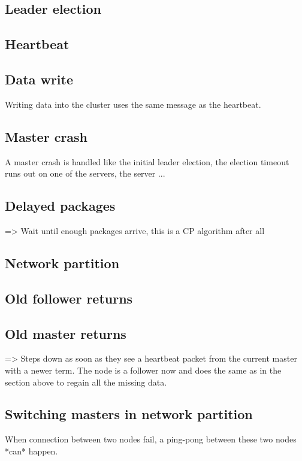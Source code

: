 \subsection{Leader election}

\subsection{Heartbeat}

\subsection{Data write}
Writing data into the cluster uses the same message as the heartbeat.


\subsection{Master crash}
A master crash is handled like the initial leader election, the election timeout runs out on one of the servers, the server ...

\subsection{Delayed packages}
=> Wait until enough packages arrive, this is a CP algorithm after all

\subsection{Network partition}

\subsection{Old follower returns}


\subsection{Old master returns}
=> Steps down as soon as they see a heartbeat packet from the current master with a newer term.
The node is a follower now and does the same as in the section above to regain all the missing data.

\subsection{Switching masters in network partition}
When connection between two nodes fail, a ping-pong between these two nodes *can* happen.


